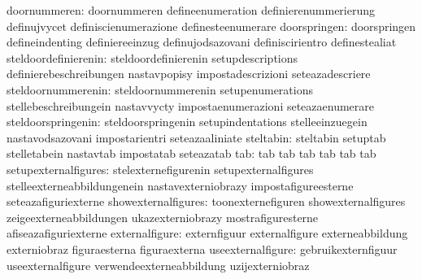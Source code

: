                     doornummeren: doornummeren                     defineenumeration
                                  definierenummerierung            definujvycet
                                  definiscienumerazione            definesteenumerare
                    doorspringen: doorspringen                     defineindenting
                                  definiereeinzug                  definujodsazovani
                                  definiscirientro                 definestealiat
            steldoordefinierenin: steldoordefinierenin             setupdescriptions
                                  definierebeschreibungen          nastavpopisy
                                  impostadescrizioni               seteazadescriere
              steldoornummerenin: steldoornummerenin               setupenumerations
                                  stellebeschreibungein            nastavvycty
                                  impostaenumerazioni              seteazaenumerare
              steldoorspringenin: steldoorspringenin               setupindentations
                                  stelleeinzuegein                 nastavodsazovani
                                  impostarientri                   seteazaaliniate
                       steltabin: steltabin                        setuptab
                                  stelletabein                     nastavtab
                                  impostatab                       seteazatab
                             tab: tab                              tab
                                  tab                              tab
                                  tab                              tab
            setupexternalfigures: stelexternefigurenin             setupexternalfigures
                                  stelleexterneabbildungenein      nastavexterniobrazy
                                  impostafigureesterne             seteazafiguriexterne
             showexternalfigures: toonexternefiguren               showexternalfigures
                                  zeigeexterneabbildungen          ukazexterniobrazy
                                  mostrafiguresterne               afiseazafiguriexterne
                  externalfigure: externfiguur                     externalfigure
                                  externeabbildung                 externiobraz
                                  figuraesterna                    figuraexterna
               useexternalfigure: gebruikexternfiguur              useexternalfigure
                                  verwendeexterneabbildung         uzijexterniobraz
